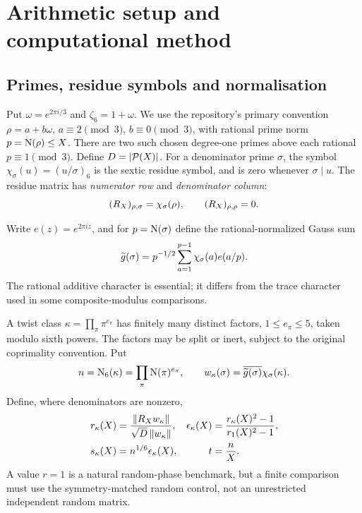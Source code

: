 \section{Arithmetic setup and computational method}\label{sec:setup}
\subsection{Primes, residue symbols and normalisation}
Put \(\omega=e^{2\pi i/3}\) and \(\zeta_6=1+\omega\).
We use the repository's primary convention
\(\rho=a+b\omega\), \(a\equiv2\pmod3\), \(b\equiv0\pmod3\),
with rational prime norm \(p=\operatorname{N}(\rho)\le X\).
There are two such chosen degree-one primes above each rational
\(p\equiv1\pmod3\). Define \(D=|\mathcal P(X)|\).
For a denominator prime \(\sigma\), the symbol
\(\chi_\sigma(u)=(u/\sigma)_6\) is the sextic residue symbol,
and is zero whenever \(\sigma\mid u\).
The residue matrix has \emph{numerator row} and \emph{denominator
column}:
\[
 (R_X)_{\rho,\sigma}=\chi_\sigma(\rho),\qquad
 (R_X)_{\rho,\rho}=0.
\]

Write \(e(z)=e^{2\pi iz}\), and for \(p=\operatorname{N}(\sigma)\) define
the rational-normalized Gauss sum
\[
 \widetilde g(\sigma)=p^{-1/2}\sum_{a=1}^{p-1}
       \chi_\sigma(a)e(a/p).
\]
The rational additive character is essential; it differs from the
trace character used in some composite-modulus comparisons.

A twist class \(\kappa=\prod_\pi\pi^{e_\pi}\) has finitely
many distinct factors, \(1\le e_\pi\le5\), taken modulo sixth powers.
The factors may be split or inert, subject to the original
coprimality convention. Put
\[
 n=\operatorname{N}_6(\kappa)=\prod_\pi\operatorname{N}(\pi)^{e_\pi},\qquad
 w_\kappa(\sigma)=\overline{\widetilde g(\sigma)}\chi_\sigma(\kappa).
\]
Define, where denominators are nonzero,
\begin{align}
 r_\kappa(X)&=\frac{\|R_X w_\kappa\|}
                  {\sqrt D\,\|w_\kappa\|},&
 \epsilon_\kappa(X)&=\frac{r_\kappa(X)^2-1}{r_1(X)^2-1},
 \label{eq:r}\\
 s_\kappa(X)&=n^{1/6}\epsilon_\kappa(X),&
 t&=\frac nX.\label{eq:st}
\end{align}
A value \(r=1\) is a natural random-phase benchmark, but a finite
comparison must use the symmetry-matched random control, not an
unrestricted independent random matrix.


